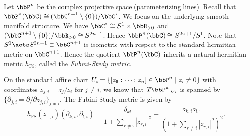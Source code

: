 \begin{example}\label{eg:Fubini-Study_metric_on_P^n}
	Let \(\bbP^n\) be the complex projective space (parameterizing lines).
	Recall that \(\bbP^n(\bbC) \cong (\bbC^{n+1} \setminus \{0\})/\bbC^*\).
	We focus on the underlying smooth manifold structure.
	We have \(\bbC^* \cong S^1 \times \bbR_{>0}\) and \((\bbC^{n+1} \setminus \{0\})/ \bbR_{>0} \cong S^{2n+1}\).
	Hence \(\bbP^n(\bbC) \cong S^{2n+1}/S^1\).
	Note that \(S^1 \acts S^{2n+1} \subset \bbC^{n+1}\) is isometric with respect to the standard hermitian metric on \(\bbC^{n+1}\).
	Hence the quotient \(\bbP^n(\bbC)\) inherits a natural hermitian metric \(h_{\text{FS}}\), called the \emph{Fubini-Study metric}.

	On the standard affine chart \(U_i = \{[z_0: \cdots : z_n] \in \bbP^n \mid z_i \neq 0\}\) with coordinates \(z_{j,i} = z_j/z_i\) for \(j \neq i\),
	we know that \(T\bbP^n|_{U_i}\) is spanned by \(\{\partial_{j,i} = \partial/\partial z_{j,i}\}_{j \neq i}\).
	The Fubini-Study metric is given by
	\[h_{\text{FS}}(z_{-,i})(\partial_{k,i}, \partial_{l,i}) = \frac{\delta_{kl}}{1 + \sum_{r \neq i} |z_{r,i}|^2} - \frac{\overline{z_{k,i}} z_{l,i}}{(1 + \sum_{r \neq i} |z_{r,i}|^2)^2}.\]

\end{example}
